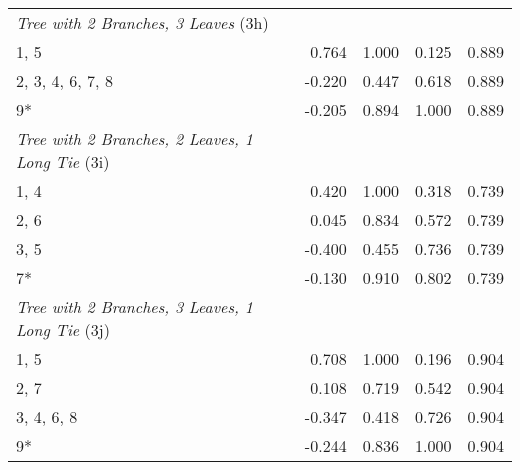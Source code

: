 \begin{table}
\begin{tabular}[t]{lrrrr}
\midrule
\midrule
\textit{Tree with 2 Branches, 3 Leaves} (3h)\\
1, 5 & 0.764 & 1.000 & 0.125 & 0.889\\
2, 3, 4, 6, 7, 8 & -0.220 & 0.447 & 0.618 & 0.889\\
9* & -0.205 & 0.894 & 1.000 & 0.889\\
\midrule
\midrule
\textit{Tree with 2 Branches, 2 Leaves, 1 Long Tie} (3i)\\
1, 4 & 0.420 & 1.000 & 0.318 & 0.739\\
2, 6 & 0.045 & 0.834 & 0.572 & 0.739\\
3, 5 & -0.400 & 0.455 & 0.736 & 0.739\\
7* & -0.130 & 0.910 & 0.802 & 0.739\\
\midrule
\midrule
\textit{Tree with 2 Branches, 3 Leaves, 1 Long Tie} (3j)\\
1, 5 & 0.708 & 1.000 & 0.196 & 0.904\\
2, 7 & 0.108 & 0.719 & 0.542 & 0.904\\
3, 4, 6, 8 & -0.347 & 0.418 & 0.726 & 0.904\\
9* & -0.244 & 0.836 & 1.000 & 0.904\\
\bottomrule
\bottomrule
\end{tabular}
\end{table}